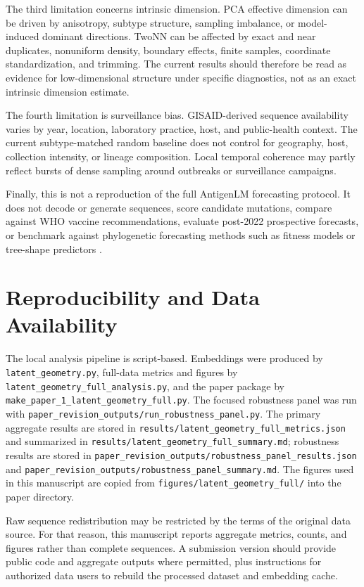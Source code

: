 \documentclass[11pt]{article}
\begin{document}
The third limitation concerns intrinsic dimension. PCA effective dimension can be driven by anisotropy, subtype structure, sampling imbalance, or model-induced dominant directions. TwoNN can be affected by exact and near duplicates, nonuniform density, boundary effects, finite samples, coordinate standardization, and trimming. The current results should therefore be read as evidence for low-dimensional structure under specific diagnostics, not as an exact intrinsic dimension estimate.

The fourth limitation is surveillance bias. GISAID-derived sequence availability varies by year, location, laboratory practice, host, and public-health context. The current subtype-matched random baseline does not control for geography, host, collection intensity, or lineage composition. Local temporal coherence may partly reflect bursts of dense sampling around outbreaks or surveillance campaigns.

Finally, this is not a reproduction of the full AntigenLM forecasting protocol. It does not decode or generate sequences, score candidate mutations, compare against WHO vaccine recommendations, evaluate post-2022 prospective forecasts, or benchmark against phylogenetic forecasting methods such as fitness models or tree-shape predictors \cite{luksza2014fitness,neher2014predicting,hadfield2018nextstrain}.

\section{Reproducibility and Data Availability}

The local analysis pipeline is script-based. Embeddings were produced by \texttt{latent\_geometry.py}, full-data metrics and figures by \texttt{latent\_geometry\_full\_analysis.py}, and the paper package by \texttt{make\_paper\_1\_latent\_geometry\_full.py}. The focused robustness panel was run with \texttt{paper\_revision\_outputs/run\_robustness\_panel.py}. The primary aggregate results are stored in \texttt{results/latent\_geometry\_full\_metrics.json} and summarized in \texttt{results/latent\_geometry\_full\_summary.md}; robustness results are stored in \texttt{paper\_revision\_outputs/robustness\_panel\_results.json} and \texttt{paper\_revision\_outputs/robustness\_panel\_summary.md}. The figures used in this manuscript are copied from \texttt{figures/latent\_geometry\_full/} into the paper directory.

Raw sequence redistribution may be restricted by the terms of the original data source. For that reason, this manuscript reports aggregate metrics, counts, and figures rather than complete sequences. A submission version should provide public code and aggregate outputs where permitted, plus instructions for authorized data users to rebuild the processed dataset and embedding cache.
\end{document}
